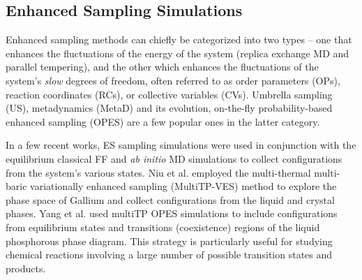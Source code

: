 \documentclass[9pt,bestpractices]{livecoms}
\begin{document}
\subsection{Enhanced Sampling Simulations}
Enhanced sampling methods can chiefly be categorized into two types -- one that
enhances the fluctuations of the energy of the system (replica exchange MD and
parallel tempering), and the other which enhances the fluctuations of the
system's {\em slow} degrees of freedom, often referred to as order parameters
(OPs), reaction coordinates (RCs), or collective variables (CVs). Umbrella
sampling (US), metadynamics (MetaD) and its evolution, on-the-fly
probability-based enhanced sampling (OPES) are a few popular ones in the latter
category.

In a few recent works, ES sampling simulations were used in conjunction with the
equilibrium classical FF and {\em ab initio} MD simulations to collect
configurations from the system's various states. Niu {et al.} employed the
multi-thermal multi-baric variationally enhanced sampling (MultiTP-VES) method
to explore the phase space of Gallium and collect configurations from the liquid
and crystal phases. Yang {et al.} used multiTP OPES simulations to include
configurations from equilibrium states and transitions (coexistence) regions of
the liquid phosphorous phase diagram. This strategy is particularly useful for
studying chemical reactions involving a large number of possible transition
states and products.




\end{document}
